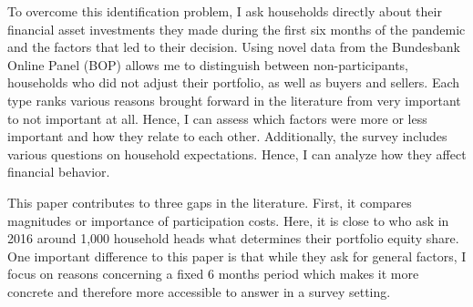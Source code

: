 \documentclass[ProjectABM]{subfiles}
\begin{document}
 To overcome this identification problem, I ask households directly about their financial asset investments they made during the first six months of the pandemic and the factors that led to their decision. 
 Using novel data from the Bundesbank Online Panel (BOP) allows me to distinguish between non-participants, households who did not adjust their portfolio, as well as buyers and sellers. Each type ranks various reasons brought forward in the literature from very important to not important at all. Hence, I can assess which factors were more or less important and how they relate to each other. 
 Additionally, the survey includes various questions on household expectations. Hence, I can analyze how they affect financial behavior.



This paper contributes to three gaps in the literature. First, it compares magnitudes or importance of participation costs. Here, it is close to \cite{choi_2020} who ask in 2016 around 1,000 household heads what determines their portfolio equity share. One important difference to this paper is that while they ask for general factors, I focus on reasons concerning a fixed 6 months period which makes it more concrete and therefore more accessible to answer in a survey setting. %
\end{document}
